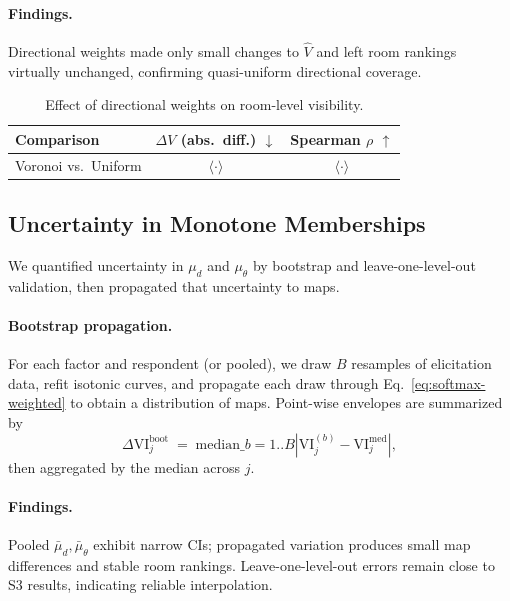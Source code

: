 \documentclass[final,3p,times,review]{elsarticle}
\begin{document}
\paragraph{Findings.}
Directional weights made only small changes to $\widehat{V}$ and left room rankings virtually unchanged, confirming quasi-uniform directional coverage.

\begin{table}[H]
\centering
\caption{Effect of directional weights on room-level visibility.}
\label{tab:omega}
\begin{tabular}{@{}lcc@{}}
\toprule
Comparison & \(\Delta V\) (abs.\ diff.) \(\downarrow\) & Spearman \(\rho\) \(\uparrow\) \\
\midrule
Voronoi vs.\ Uniform & \(\langle\cdot\rangle\) & \(\langle\cdot\rangle\) \\
\bottomrule
\end{tabular}
\end{table}


\subsection{Uncertainty in Monotone Memberships}
We quantified uncertainty in $\mu_d$ and $\mu_\theta$ by bootstrap and leave-one-level-out validation, then propagated that uncertainty to maps.

\paragraph{Bootstrap propagation.}
For each factor and respondent (or pooled), we draw $B$ resamples of elicitation data, refit isotonic curves, and propagate each draw through Eq.~\eqref{eq:softmax-weighted} to obtain a distribution of maps. Point-wise envelopes are summarized by
\begin{equation}
\Delta \mathrm{VI}_j^{\mathrm{boot}} \;=\; \mathrm{median}\_{b=1..B}\left| \mathrm{VI}_j^{(b)} - \mathrm{VI}_j^{\mathrm{med}} \right|,
\label{eq:boot-map-diff}
\end{equation}
then aggregated by the median across $j$.

\paragraph{Findings.}
Pooled $\bar{\mu}_d,\bar{\mu}_\theta$ exhibit narrow CIs; propagated variation produces small map differences and stable room rankings. Leave-one-level-out errors remain close to S3 results, indicating reliable interpolation.
\end{document}
